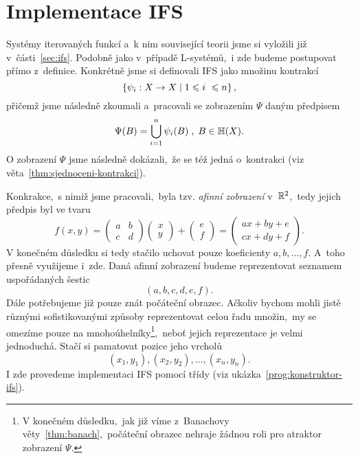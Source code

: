 \section{Implementace IFS}\label{sec:implementace-ifs}

Systémy iterovaných funkcí a~k nim související teorii jsme si vyložili již v~části~\ref{sec:ifs}. Podobně jako v~případě L-systémů,~i zde budeme postupovat přímo z~definice. Konkrétně jsme si definovali IFS jako množinu kontrakcí
\[\left\{\psi_i:X \rightarrow X\mid 1\leqslant i~\leqslant n\right\},\]
přičemž jsme následně zkoumali a~pracovali se zobrazením $\Psi$ daným předpisem
\[\Psi(B)=\bigcup_{i=1}^n\psi_i(B)\;,\;B\in\mathbb{H}(X).\]
O zobrazení $\Psi$ jsme následně dokázali,~že se též jedná o~kontrakci (viz věta~\ref{thm:sjednoceni-kontrakci}).

Konkrakce,~s nimiž jsme pracovali,~byla tzv. \emph{afinní zobrazení} v~$\mathbb{R}^2$,~tedy jejich předpis byl ve tvaru
\begin{equation}\label{eq:afinni-zobrazeni}
    f(x,y)=\left(\begin{matrix}
        a & b\\
        c & d
    \end{matrix}\right)\left(\begin{matrix}
        x\\
        y
    \end{matrix}\right)+\left(\begin{matrix}
        e\\
        f
    \end{matrix}\right)=\left(\begin{matrix}
        ax+by+e\\
        cx+dy+f
    \end{matrix}\right).
\end{equation}
V konečném důsledku si tedy stačilo uchovat pouze koeficienty $a,b,\ldots,f$. A~toho přesně využijeme i~zde. Daná afinní zobrazení budeme reprezentovat seznamem uspořádaných šestic
\[(a,b,c,d,e,f).\]
Dále potřebujeme již pouze znát počáteční obrazec. Ačkoliv bychom mohli jistě různými sofistikovanými způsoby reprezentovat celou řadu množin,~my se omezíme pouze na mnohoúhelníky\footnote{V konečném důsledku,~jak již víme z~Banachovy věty~\ref{thm:banach},~počáteční obrazec nehraje žádnou roli pro atraktor zobrazení $\Psi$.},~neboť jejich reprezentace je velmi jednoduchá. Stačí si pamatovat pozice jeho vrcholů
\[(x_1,y_1),(x_2,y_2),\ldots,(x_n,y_n).\]
I zde provedeme implementaci IFS pomocí třídy (viz ukázka~\ref{prog:konstruktor-ifs}).
